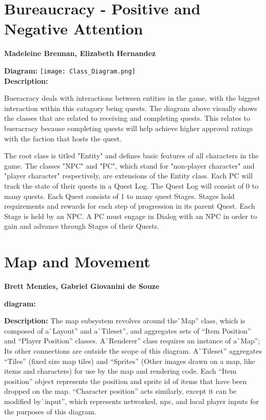 \documentclass[12pt]{report}
\begin{document}
\chapter{Bureaucracy - Positive and Negative Attention}
\textbf{Madeleine Brennan, Elizabeth Hernandez}

\textbf{Diagram:}
\texttt{[image: Class\_Diagram.png]}\\

\textbf{Description:}

Bueracracy deals with interactions between entities in the game, with the biggest interaction within this catagory being quests. The diagram above visually shows the classes that are related to receiving and completing quests. This relates to bueracracy because completing quests will help achieve higher approval ratings with the faction that hosts the quest.

The root class is titled "Entity" and defines basic features of all characters in the game.
The classes "NPC" and "PC", which stand for "non-player character" and "player character" respectively, are extensions of the Entity class. 
Each PC will track the state of their quests in a Quest Log. 
The Quest Log will consist of 0 to many quests.
Each Quest consists of 1 to many quest Stages.
Stages hold requirements and rewards for each step of progression in its parent Quest.
Each Stage is held by an NPC.
A PC must engage in Dialog with an NPC in order to gain and advance through Stages of their Quests.

\chapter{Map and Movement}
\textbf{Brett Menzies, Gabriel Giovanini de Souze}

\textbf{diagram:}

\textbf{Description:}
The map subsystem revolves around the\`{ }Map'' class,
which is composed of a\`{ }Layout'' and a\`{ }Tileset'',
 and aggregates sets of ``Item Position'' and ``Player Position'' classes.
 A\`{ }Renderer'' class requires an instance of a\`{ }Map'';
  Its other connections are outside the scope of this diagram.
  A\`{ }Tileset'' aggregates ``Tiles'' (fixed size map tiles) and 
   ``Sprites'' (Other images drawn on a map, like items and characters) for use by the map and rendering code.
    Each ``Item position'' object represents the position and sprite id of items that have been dropped on the map.
    ``Character position'' acts similarly, except it can be modified by\`{ }input'', which represents 
     networked, npc, and local player inputs for the purposes of this diagram.
\end{document}
